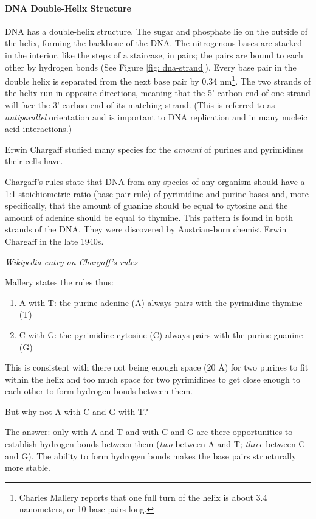 \documentclass[12pt]{article}
\begin{document}
\paragraph{DNA Double-Helix Structure}
DNA has a double-helix structure. The sugar and phosphate lie on the outside of the helix, forming the backbone of the DNA. The nitrogenous bases are stacked in the interior, like the steps of a staircase, in pairs; the pairs are bound to each other by hydrogen bonds (See Figure \ref{fig: dna-strand}). Every base pair in the double helix is separated from the next base pair by 0.34 nm\footnote{Charles Mallery \cite{mallery} reports that one full turn of the helix is about 3.4 nanometers, or 10 base pairs long.}. The two strands of the helix run in opposite directions, meaning that the 5' carbon end of one strand will face the 3' carbon end of its matching strand. (This is referred to as \emph{antiparallel} orientation and is important to DNA replication and in many nucleic acid interactions.)

Erwin Chargaff studied many species for the \emph{amount} of purines and pyrimidines their cells have. 

\epigraph{
    Chargaff's rules state that DNA from any species of any organism should have a 1:1 stoichiometric ratio (base pair rule) of pyrimidine and purine bases and, more specifically, that the amount of guanine should be equal to cytosine and the amount of adenine should be equal to thymine. This pattern is found in both strands of the DNA. They were discovered by Austrian-born chemist Erwin Chargaff in the late 1940s.
}{
    \textit{Wikipedia entry on Chargaff's rules}
}

Mallery \cite{mallery} states the rules thus:
\begin{enumerate}
    \item A with T: the purine adenine (A) always pairs with the pyrimidine thymine (T)
    \item C with G:  the pyrimidine cytosine (C) always pairs with the purine guanine (G)
\end{enumerate}

This is consistent with there not being enough space (20 \si{\angstrom}) for two purines to fit within the helix and too much space for two pyrimidines to get close enough to each other to form hydrogen bonds between them.

But why not A with C and G with T?

The answer: only with A and T and with C and G are there opportunities to establish hydrogen bonds between them (\emph{two} between A and T; \emph{three} between C and G). The ability to form hydrogen bonds makes the base pairs structurally more stable.
\end{document}
